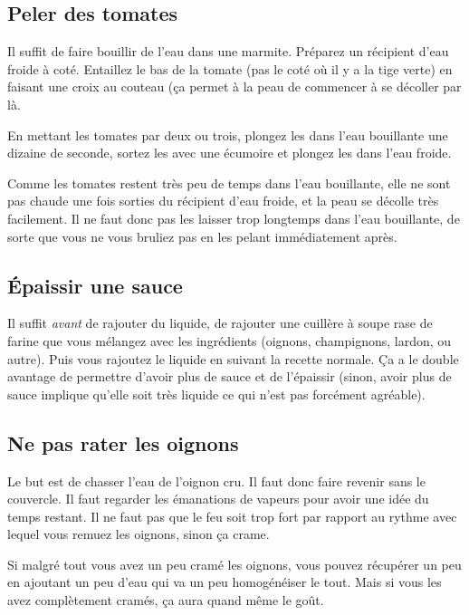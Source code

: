 \documentclass[a4paper,twoside,openright]{report}
\begin{document}
\subsection{Peler des tomates}\label{sec:peler_tomate}
Il suffit de faire bouillir de l'eau dans une marmite. Préparez un récipient d'eau froide à coté.
Entaillez le bas de la tomate (pas le coté où il y a la tige verte) en faisant une croix au couteau (ça permet à la peau de commencer à se décoller par là. 

En mettant les tomates par deux ou trois, plongez les dans l'eau bouillante une dizaine de seconde, sortez les avec une écumoire et plongez les dans l'eau froide. 

\begin{remarque}
Comme les tomates restent très peu de temps dans l'eau bouillante, elle ne sont pas chaude une fois sorties du récipient d'eau froide, et la peau se décolle très facilement. Il ne faut donc pas les laisser trop longtemps dans l'eau bouillante, de sorte que vous ne vous bruliez pas en les pelant immédiatement après.
\end{remarque}



\subsection{Épaissir une sauce}
Il suffit \emph{avant} de rajouter du liquide, de rajouter une cuillère à soupe rase de farine que vous mélangez avec les ingrédients (oignons, champignons, lardon, ou autre). Puis vous rajoutez le liquide en suivant la recette normale. Ça a le double avantage de permettre d'avoir plus de sauce et de l'épaissir (sinon, avoir plus de sauce implique qu'elle soit très liquide ce qui n'est pas forcément agréable).

\subsection{Ne pas rater les oignons}
Le but est de chasser l'eau de l'oignon cru. Il faut donc faire revenir sans le couvercle. Il faut regarder les émanations de vapeurs pour avoir une idée du temps restant. Il ne faut pas que le feu soit trop fort par rapport au rythme avec lequel vous remuez les oignons, sinon ça crame. 

Si malgré tout vous avez un peu cramé les oignons, vous pouvez récupérer un peu en ajoutant un peu d'eau qui va un peu homogénéiser le tout. Mais si vous les avez complètement cramés, ça aura quand même le goût.
\end{document}

